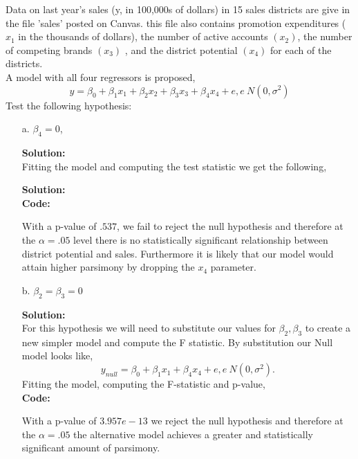 \documentclass[12pt]{article}
\makeatletter
\theoremstyle{homework}
\newenvironment{exercise}[1]
{\def\@currentlabel{#1}\exercisecore}
{\endexercisecore}
\newcommand{\localhead}[1]{\par\smallskip\noindent\textbf{#1}\nobreak\\}%
\newcommand\solution{\localhead{Solution:}}
\makeatother
\begin{document}
\newpage
 
\begin{exercise}{2} Data on last year's sales (y, in 100,000s of dollars) in 15 sales districts are give in the file 'sales'
  posted on Canvas. this file also contains promotion expenditures ($x_1$ in the thousands of dollars), the number 
  of active accounts $(x_2)$, the number of competing brands $(x_3)$ , and the district potential $(x_4)$ for each 
  of the districts.\\
  A model with all four regressors is proposed, 
  \begin{equation*}
    y = \beta_0 + \beta_1x_1 + \beta_2x_2 + \beta_3x_3 + \beta_4x_4 + e, e ~ N(0, \sigma^2)
  \end{equation*}
  Test the following hypothesis: 
  \begin{enumerate}
    \item[a.] $\beta_4 = 0$,
    \solution 
    Fitting the model and computing the test statistic we get the following, 
    \solution
    \textbf{Code:}
    \begin{center}
    
    \end{center} 
    With a p-value of $.537$, we fail to reject the null hypothesis and therefore at the  $\alpha = .05$ level 
    there is no statistically significant relationship between district potential and sales. Furthermore it is 
    likely that our model would attain higher parsimony by dropping the $x_4$ parameter. 
    \newpage


    \item[b.]$\beta_2 = \beta_3 = 0$\\
    \solution For this hypothesis we will need to substitute our values for $\beta_2, \beta_3$ to create a new
    simpler model and compute the F statistic. By substitution our Null model looks like, 
    \begin{equation*}
      y_{null} = \beta_0 + \beta_1x_1 + \beta_4x_4 + e, e ~ N(0, \sigma^2).
    \end{equation*}
    Fitting the model, computing the F-statistic and p-value,\\ 
    \textbf{Code:}
    \begin{center}
    
    \end{center} 
    With a p-value of $3.957e-13$ we reject the null hypothesis and therefore at the $\alpha = .05$ the 
    alternative model achieves a greater and statistically significant amount of parsimony.
    \newpage



\end{enumerate}
\end{exercise}
\end{document}
